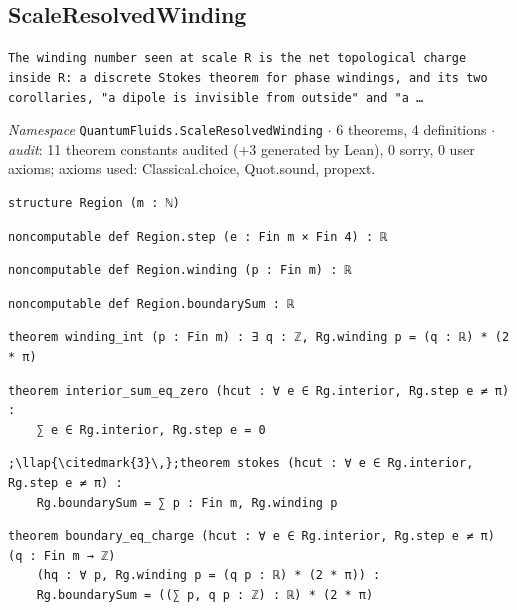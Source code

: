 \subsection{ScaleResolvedWinding}\label{appA:ScaleResolvedWinding}
{\footnotesize\raggedright\texttt{The winding number seen at scale R is the net topological charge inside R: a discrete Stokes theorem for phase windings,\allowbreak{} and its two corollaries,\allowbreak{} "a dipole is invisible from outside" and "a …}\par}
{\footnotesize\raggedright\emph{Namespace} \texttt{QuantumFluids.\allowbreak{}ScaleResolvedWinding} $\cdot$ 6 theorems, 4 definitions $\cdot$ \emph{audit}: 11 theorem constants audited (+3 generated by Lean), 0 sorry, 0 user axioms; axioms used: Classical.choice, Quot.sound, propext.\par}
\vspace{1pt}
\begin{lstlisting}[style=leancat]
structure Region (m : ℕ)
\end{lstlisting}

\begin{lstlisting}[style=leancat]
noncomputable def Region.step (e : Fin m × Fin 4) : ℝ
\end{lstlisting}

\begin{lstlisting}[style=leancat]
noncomputable def Region.winding (p : Fin m) : ℝ
\end{lstlisting}

\begin{lstlisting}[style=leancat]
noncomputable def Region.boundarySum : ℝ
\end{lstlisting}

\begin{lstlisting}[style=leancat]
theorem winding_int (p : Fin m) : ∃ q : ℤ, Rg.winding p = (q : ℝ) * (2 * π)
\end{lstlisting}

\begin{lstlisting}[style=leancat]
theorem interior_sum_eq_zero (hcut : ∀ e ∈ Rg.interior, Rg.step e ≠ π) :
    ∑ e ∈ Rg.interior, Rg.step e = 0
\end{lstlisting}

\begin{lstlisting}[style=leancat]
;\llap{\citedmark{3}\,};theorem stokes (hcut : ∀ e ∈ Rg.interior, Rg.step e ≠ π) :
    Rg.boundarySum = ∑ p : Fin m, Rg.winding p
\end{lstlisting}

\begin{lstlisting}[style=leancat]
theorem boundary_eq_charge (hcut : ∀ e ∈ Rg.interior, Rg.step e ≠ π) (q : Fin m → ℤ)
    (hq : ∀ p, Rg.winding p = (q p : ℝ) * (2 * π)) :
    Rg.boundarySum = ((∑ p, q p : ℤ) : ℝ) * (2 * π)
\end{lstlisting}

